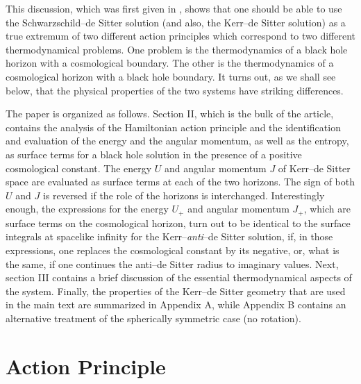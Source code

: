\documentclass[a4paper,preprintnumbers,amsmath,amssymb]{revtex4}
\begin{document}
This discussion, which was first given in \cite{CT},
 shows that one should be able to use the Schwarzschild--de Sitter solution
(and also, the Kerr--de Sitter solution)  as a true extremum of two different action
principles which correspond to two different thermodynamical problems. One problem is the
thermodynamics of a black hole horizon with a cosmological boundary. The
other is the thermodynamics of a cosmological horizon with a black hole
boundary. It turns out, as we shall see below, that the physical
properties of the two systems have striking differences.

 The paper is organized as follows. Section II, which is the bulk of the article, contains the analysis of the
Hamiltonian action principle and the identification and evaluation of the energy and the
angular momentum, as well as the entropy, as surface terms for a black hole solution in the presence of a positive
cosmological constant.  The energy $U$ and angular momentum $J$ of Kerr--de Sitter space
are evaluated as surface terms at each of the two horizons. The sign of both $U$ and $J$
is reversed if the role of the horizons is interchanged. Interestingly enough, the expressions
for the energy $U_+$ and angular momentum $J_+$, which are surface terms on the cosmological
horizon, turn out to be identical to the surface integrals at spacelike infinity for the
Kerr--{\it anti}--de Sitter solution, if, in those expressions, one replaces the cosmological
constant by its negative, or, what is the same, if one continues the anti--de Sitter
radius to imaginary values. Next, section III contains a brief discussion of the essential thermodynamical
aspects of the system. Finally, the properties of the Kerr--de Sitter geometry that are used in the main text are
summarized in Appendix A, while Appendix B contains an alternative treatment
of the spherically symmetric case (no rotation).

\section{Action Principle}
\label{one}
\end{document}
